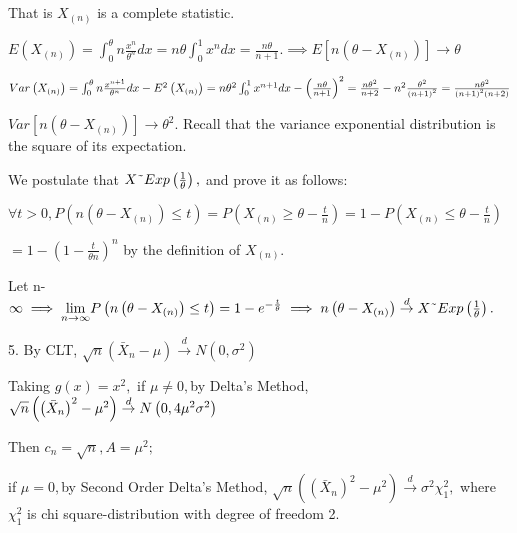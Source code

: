 \documentclass{ctexart}
\begin{document}
That is $X_{\left( n\right) }$ is a complete statistic.

$E\left( X_{\left( n\right) }\right) =\int_{0}^{\theta }n\frac{x^{n}}{\theta
^{n}}dx=n\theta \int_{0}^{1}x^{n}dx=\frac{n\theta }{n+1}.\implies E\left[
n\left( \theta -X_{\left( n\right) }\right) \right] \rightarrow \theta $

$Var\left( X_{\left( n\right) }\right) =\int_{0}^{\theta }n\frac{x^{n+1}}{%
\theta ^{n}}dx-E^{2}\left( X_{\left( n\right) }\right) =n\theta
^{2}\int_{0}^{1}x^{n+1}dx-\left( \frac{n\theta }{n+1}\right) ^{2}=\frac{%
n\theta ^{2}}{n+2}-n^{2}\frac{\theta ^{2}}{\left( n+1\right) ^{2}}=\frac{%
n\theta ^{2}}{\left( n+1\right) ^{2}\left( n+2\right) }$

$Var\left[ n\left( \theta -X_{\left( n\right) }\right) \right] \rightarrow
\theta ^{2}.$ Recall that the variance exponential distribution is the
square of its expectation.

We postulate that $X\symbol{126}Exp\left( \frac{1}{\theta }\right) ,$ and
prove it as follows:

$\forall t>0,P\left( n\left( \theta -X_{\left( n\right) }\right) \leq
t\right) =P\left( X_{\left( n\right) }\geq \theta -\frac{t}{n}\right)
=1-P\left( X_{\left( n\right) }\leq \theta -\frac{t}{n}\right) $

$=1-\left( 1-\frac{t}{\theta n}\right) ^{n}$ by the definition of $X_{\left(
n\right) }.$

Let n-\TEXTsymbol{>}$\infty \implies \underset{n\rightarrow \infty }{\lim }%
P\left( n\left( \theta -X_{\left( n\right) }\right) \leq t\right) =1-e^{-%
\frac{t}{\theta }}\implies n\left( \theta -X_{\left( n\right) }\right) 
\overset{d}{\rightarrow }X\symbol{126}Exp\left( \frac{1}{\theta }\right) .$

5. By CLT, $\sqrt{n}\left( \bar{X}_{n}-\mu \right) \overset{d}{\rightarrow }%
N\left( 0,\sigma ^{2}\right) $

Taking $g\left( x\right) =x^{2},$ if $\mu \neq 0,$by Delta's Method, $\sqrt{n%
}\left( \left( \bar{X}_{n}\right) ^{2}-\mu ^{2}\right) \overset{d}{%
\rightarrow }N\left( 0,4\mu ^{2}\sigma ^{2}\right) $

Then $c_{n}=\sqrt{n},A=\mu ^{2};$

if $\mu =0,$by Second Order Delta's Method, $\sqrt{n}\left( \left( \bar{X}%
_{n}\right) ^{2}-\mu ^{2}\right) \overset{d}{\rightarrow }\sigma ^{2}\chi
_{1}^{2},$ where $\chi _{1}^{2}$ is chi square-distribution with degree of
freedom 2.

\qquad
\end{document}
